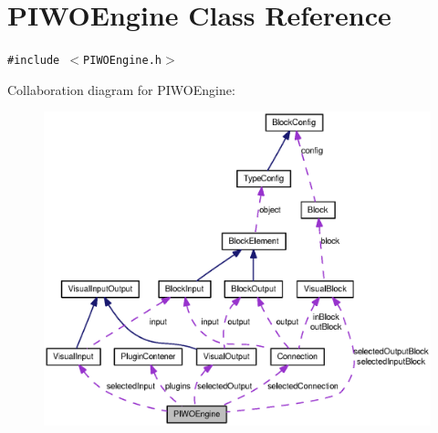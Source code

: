 \hypertarget{classPIWOEngine}{
\section{PIWOEngine Class Reference}
\label{classPIWOEngine}
}
{\tt \#include $<$PIWOEngine.h$>$}

Collaboration diagram for PIWOEngine:\nopagebreak
\begin{figure}[H]
\begin{center}
\leavevmode
\includegraphics[width=400pt]{classPIWOEngine__coll__graph}
\end{center}
\end{figure}
